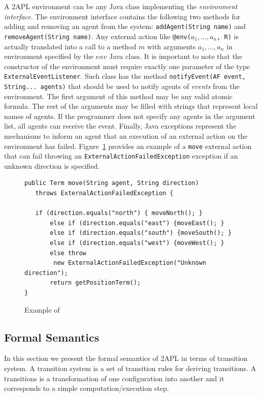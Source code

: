 \documentclass[a4paper]{article}
\begin{document}
A 2APL environment can be any Java class implementing the \emph{environment interface}. The environment interface contains the following two methods for adding and removing an agent from the system: \texttt{addAgent(String name)} and \texttt{removeAgent(String name)}. Any external action like \texttt{@env($a_1, \ldots, a_n$, R)} is actually translated into a call to a method $m$ with arguments $a_1, \ldots, a_n$ in environment specified by the $env$ Java class. It is important to note that the constructor of the environment must require exactly one parameter of the type \texttt{ExternalEventListener}. Such class has the method \texttt{notifyEvent(AF event, String... agents)} that should be used to notify agents of \emph{events} from the environment. The first argument of this method may be any valid atomic formula. The rest of the arguments may be filled with strings that represent local names of agents. If the programmer does not specify any agents in the argument list, all agents can receive the event. Finally, Java exceptions represent the mechanisms to inform an agent that an execution of an external action on the environment has failed. Figure~\ref{fig:example_env} provides an example of a \texttt{move} external action that can fail throwing an \texttt{ExternalActionFailedException} exception if an unknown direction is specified.

\begin{figure}[htp]
\begin{verbatim}
public Term move(String agent, String direction)
   throws ExternalActionFailedException {
  	   
   if (direction.equals("north") { moveNorth(); }
   	   else if (direction.equals("east") {moveEast(); }
   	   else if (direction.equals("south") {moveSouth(); }
   	   else if (direction.equals("west") {moveWest(); }
   	   else throw
        new ExternalActionFailedException("Unknown direction");
   	   return getPositionTerm();
}
\end{verbatim}
\caption{Example of}
\label{fig:example_env}
\end{figure}

\subsection{Formal Semantics} %

In this section we present the formal semantics of 2APL in terms of transition system. A transition system is a set of transition rules for deriving transitions. A transitions is a transformation of one configuration into another and it corresponds to a simple computation/execution step.
\end{document}
